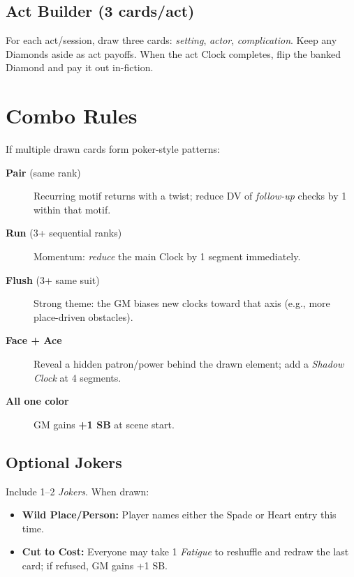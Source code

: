 \begin{multicols}{2}
\subsection*{Act Builder (3 cards/act)}
For each act/session, draw three cards: \emph{setting}, \emph{actor}, \emph{complication}. Keep any Diamonds aside as act payoffs. When the act Clock completes, flip the banked Diamond and pay it out in-fiction.

\section{Combo Rules}
If multiple drawn cards form poker-style patterns:
\begin{description}
  \item[\textbf{Pair} (same rank)] Recurring motif returns with a twist; reduce DV of \emph{follow-up} checks by 1 within that motif.
  \item[\textbf{Run} (3+ sequential ranks)] Momentum: \emph{reduce} the main Clock by 1 segment immediately.
  \item[\textbf{Flush} (3+ same suit)] Strong theme: the GM biases new clocks toward that axis (e.g., more place-driven obstacles).
  \item[\textbf{Face + Ace}] Reveal a hidden patron/power behind the drawn element; add a \emph{Shadow Clock} at 4 segments.
  \item[\textbf{All one color}] GM gains \textbf{+1 SB} at scene start.
\end{description}

\subsection*{Optional Jokers}
Include 1–2 \emph{Jokers}. When drawn:
\begin{itemize}
  \item \textbf{Wild Place/Person:} Player names either the Spade or Heart entry this time.
  \item \textbf{Cut to Cost:} Everyone may take 1 \emph{Fatigue} to reshuffle and redraw the last card; if refused, GM gains +1 SB.
\end{itemize}


\end{multicols}
